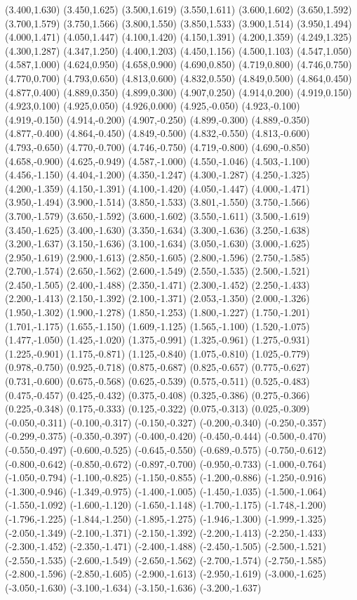 (3.400,1.630) (3.450,1.625) (3.500,1.619) (3.550,1.611) (3.600,1.602) (3.650,1.592) (3.700,1.579) (3.750,1.566) (3.800,1.550) (3.850,1.533) (3.900,1.514) (3.950,1.494) (4.000,1.471) (4.050,1.447) (4.100,1.420) (4.150,1.391) (4.200,1.359) (4.249,1.325) (4.300,1.287) (4.347,1.250) (4.400,1.203) (4.450,1.156) (4.500,1.103) (4.547,1.050) (4.587,1.000) (4.624,0.950) (4.658,0.900) (4.690,0.850) (4.719,0.800) (4.746,0.750) (4.770,0.700) (4.793,0.650) (4.813,0.600) (4.832,0.550) (4.849,0.500) (4.864,0.450) (4.877,0.400) (4.889,0.350) (4.899,0.300) (4.907,0.250) (4.914,0.200) (4.919,0.150) (4.923,0.100) (4.925,0.050) (4.926,0.000) (4.925,-0.050) (4.923,-0.100) (4.919,-0.150) (4.914,-0.200) (4.907,-0.250) (4.899,-0.300) (4.889,-0.350) (4.877,-0.400) (4.864,-0.450) (4.849,-0.500) (4.832,-0.550) (4.813,-0.600) (4.793,-0.650) (4.770,-0.700) (4.746,-0.750) (4.719,-0.800) (4.690,-0.850) (4.658,-0.900) (4.625,-0.949) (4.587,-1.000) (4.550,-1.046) (4.503,-1.100) (4.456,-1.150) (4.404,-1.200) (4.350,-1.247) (4.300,-1.287) (4.250,-1.325) (4.200,-1.359) (4.150,-1.391) (4.100,-1.420) (4.050,-1.447) (4.000,-1.471) (3.950,-1.494) (3.900,-1.514) (3.850,-1.533) (3.801,-1.550) (3.750,-1.566) (3.700,-1.579) (3.650,-1.592) (3.600,-1.602) (3.550,-1.611) (3.500,-1.619) (3.450,-1.625) (3.400,-1.630) (3.350,-1.634) (3.300,-1.636) (3.250,-1.638) (3.200,-1.637) (3.150,-1.636) (3.100,-1.634) (3.050,-1.630) (3.000,-1.625) (2.950,-1.619) (2.900,-1.613) (2.850,-1.605) (2.800,-1.596) (2.750,-1.585) (2.700,-1.574) (2.650,-1.562) (2.600,-1.549) (2.550,-1.535) (2.500,-1.521) (2.450,-1.505) (2.400,-1.488) (2.350,-1.471) (2.300,-1.452) (2.250,-1.433) (2.200,-1.413) (2.150,-1.392) (2.100,-1.371) (2.053,-1.350) (2.000,-1.326) (1.950,-1.302) (1.900,-1.278) (1.850,-1.253) (1.800,-1.227) (1.750,-1.201) (1.701,-1.175) (1.655,-1.150) (1.609,-1.125) (1.565,-1.100) (1.520,-1.075) (1.477,-1.050) (1.425,-1.020) (1.375,-0.991) (1.325,-0.961) (1.275,-0.931) (1.225,-0.901) (1.175,-0.871) (1.125,-0.840) (1.075,-0.810) (1.025,-0.779) (0.978,-0.750) (0.925,-0.718) (0.875,-0.687) (0.825,-0.657) (0.775,-0.627) (0.731,-0.600) (0.675,-0.568) (0.625,-0.539) (0.575,-0.511) (0.525,-0.483) (0.475,-0.457) (0.425,-0.432) (0.375,-0.408) (0.325,-0.386) (0.275,-0.366) (0.225,-0.348) (0.175,-0.333) (0.125,-0.322) (0.075,-0.313) (0.025,-0.309) (-0.050,-0.311) (-0.100,-0.317) (-0.150,-0.327) (-0.200,-0.340) (-0.250,-0.357) (-0.299,-0.375) (-0.350,-0.397) (-0.400,-0.420) (-0.450,-0.444) (-0.500,-0.470) (-0.550,-0.497) (-0.600,-0.525) (-0.645,-0.550) (-0.689,-0.575) (-0.750,-0.612) (-0.800,-0.642) (-0.850,-0.672) (-0.897,-0.700) (-0.950,-0.733) (-1.000,-0.764) (-1.050,-0.794) (-1.100,-0.825) (-1.150,-0.855) (-1.200,-0.886) (-1.250,-0.916) (-1.300,-0.946) (-1.349,-0.975) (-1.400,-1.005) (-1.450,-1.035) (-1.500,-1.064) (-1.550,-1.092) (-1.600,-1.120) (-1.650,-1.148) (-1.700,-1.175) (-1.748,-1.200) (-1.796,-1.225) (-1.844,-1.250) (-1.895,-1.275) (-1.946,-1.300) (-1.999,-1.325) (-2.050,-1.349) (-2.100,-1.371) (-2.150,-1.392) (-2.200,-1.413) (-2.250,-1.433) (-2.300,-1.452) (-2.350,-1.471) (-2.400,-1.488) (-2.450,-1.505) (-2.500,-1.521) (-2.550,-1.535) (-2.600,-1.549) (-2.650,-1.562) (-2.700,-1.574) (-2.750,-1.585) (-2.800,-1.596) (-2.850,-1.605) (-2.900,-1.613) (-2.950,-1.619) (-3.000,-1.625) (-3.050,-1.630) (-3.100,-1.634) (-3.150,-1.636) (-3.200,-1.637) 